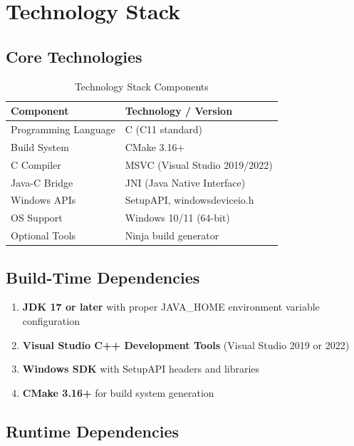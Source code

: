 \documentclass[12pt,a4paper]{article}
\begin{document}
\newpage

\section{Technology Stack}

\subsection{Core Technologies}

\begin{table}[h]
\centering
\begin{tabular}{|p{3.5cm}|p{9cm}|}
\hline
\textbf{Component} & \textbf{Technology / Version} \\
\hline
Programming Language & C (C11 standard) \\
\hline
Build System & CMake 3.16+ \\
\hline
C Compiler & MSVC (Visual Studio 2019/2022) \\
\hline
Java-C Bridge & JNI (Java Native Interface) \\
\hline
Windows APIs & SetupAPI, windowsdeviceio.h \\
\hline
OS Support & Windows 10/11 (64-bit) \\
\hline
Optional Tools & Ninja build generator \\
\hline
\end{tabular}
\caption{Technology Stack Components}
\end{table}

\subsection{Build-Time Dependencies}

\begin{enumerate}
    \item \textbf{JDK 17 or later} with proper JAVA\_HOME environment variable configuration
    \item \textbf{Visual Studio C++ Development Tools} (Visual Studio 2019 or 2022)
    \item \textbf{Windows SDK} with SetupAPI headers and libraries
    \item \textbf{CMake 3.16+} for build system generation
\end{enumerate}

\subsection{Runtime Dependencies}
\end{document}
